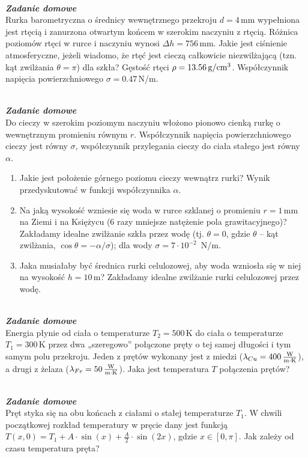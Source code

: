 \documentclass[11pt,a4paper]{article}
\newcounter{zaddom}\newcommand{\zaddom}[1][]{\addtocounter{zaddom}{1} ~\\  {\bf \emph{Zadanie domowe \arabic{zaddom} #1 }} \\}
\begin{document}
\zaddom
Rurka barometryczna o średnicy wewnętrznego przekroju $d = 4\,$mm wypełniona jest rtęcią i zanurzona otwartym
końcem w szerokim naczyniu z rtęcią. Różnica poziomów rtęci w rurce i naczyniu wynosi $\Delta h = 756\,$mm.
Jakie jest ciśnienie atmosferyczne, jeżeli wiadomo, że rtęć jest cieczą całkowicie niezwilżającą (tzn. kąt zwilżania $\theta = \pi$) dla szkła?
Gęstość rtęci $\rho = 13.56\,{\rm g/cm^3}$.
Współczynnik napięcia powierzchniowego $\sigma = 0.47\,$N/m.


\zaddom
Do cieczy w szerokim poziomym naczyniu włożono pionowo cienką rurkę o wewnętrznym promieniu równym $r$.
Współczynnik napięcia powierzchniowego cieczy jest równy $\sigma$,
współczynnik przylegania cieczy do ciała stałego jest równy $\alpha$.
\begin{enumerate}
\item Jakie jest położenie górnego poziomu cieczy wewnątrz rurki?
      Wynik przedyskutować w funkcji współczynnika $\alpha$.
\item Na jaką wysokość wzniesie się woda w rurce szklanej o promieniu $r = 1$\,mm
      na Ziemi i na Księżycu (6 razy mniejsze natężenie pola grawitacyjnego)?
      Zakładamy idealne zwilżanie szkła przez wodę (tj. $\theta = 0$,
      gdzie $\theta$ – kąt zwilżania,
      $\cos{\theta} = - \alpha/\sigma$); dla wody $\sigma = 7\cdot 10^{-2}$~N/m.
\item Jaka musiałaby być średnica rurki celulozowej, aby woda wzniosła się w niej na
      wysokość $h = 10$\,m? Zakładamy idealne zwilżanie rurki celulozowej przez wodę.
\end{enumerate}

\zaddom
Energia płynie od ciała o temperaturze $T_2 = 500\,$K do ciała o temperaturze
$T_1 = 300\,$K przez dwa „szeregowo” połączone pręty o tej samej długości i tym samym polu przekroju.
Jeden z prętów wykonany jest z miedzi ($\lambda_{Cu} = 400\,{\rm \frac{W}{m\cdot K}}$),
a drugi z żelaza ($\lambda_{Fe} = 50\,{\rm \frac{W}{m\cdot K}}$).
Jaka jest temperatura $T$ połączenia prętów?


\zaddom
Pręt styka się na obu końcach z ciałami o stałej temperaturze $T_1$.
W chwili początkowej rozkład temperatury w pręcie dany jest funkcją
$T(x,0) = T_1 + A\cdot \sin(x)+\frac{A}{2}\cdot \sin(2x)$, gdzie
$x\in [0, \pi]$. Jak zależy od czasu temperatura pręta?



\end{document}
